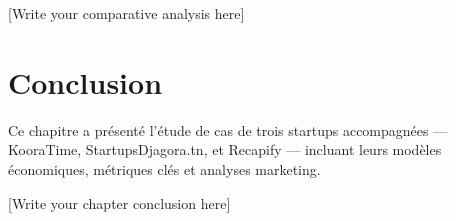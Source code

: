 [Write your comparative analysis here]


\section*{Conclusion}

Ce chapitre a présenté l'étude de cas de trois startups accompagnées — KooraTime, StartupsDjagora.tn, et Recapify — incluant leurs modèles économiques, métriques clés et analyses marketing.

[Write your chapter conclusion here]
